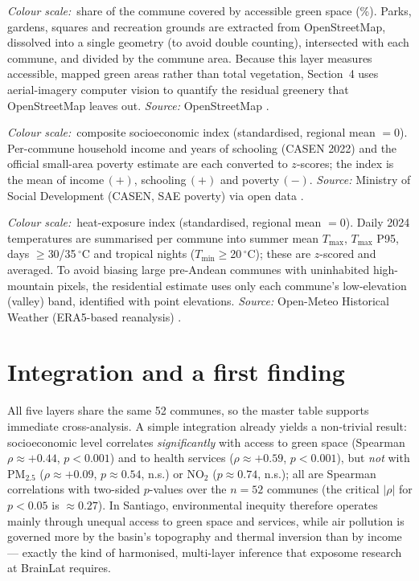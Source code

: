 \documentclass[10pt,a4paper]{article}
\let\citep\parencite
\newcommand{\colorbarval}[1]{\textit{Colour scale:}~#1}
\begin{document}
\begin{description}[leftmargin=0pt,labelsep=0.4em,itemsep=4pt,style=nextline]
\item[\textcolor{softpink}{Green space}]
\colorbarval{share of the commune covered by accessible green space (\%).}
Parks, gardens, squares and recreation grounds are extracted from OpenStreetMap, dissolved into a single geometry (to avoid double counting), intersected with each commune, and divided by the commune area. Because this layer measures accessible, mapped green areas rather than total vegetation, Section~4 uses aerial-imagery computer vision to quantify the residual greenery that OpenStreetMap leaves out. \emph{Source:} OpenStreetMap \citep{OSM2024}.

\item[\textcolor{softpink}{Socioeconomic level}]
\colorbarval{composite socioeconomic index (standardised, regional mean $=0$).}
Per-commune household income and years of schooling (CASEN 2022) and the official small-area poverty estimate are each converted to $z$-scores; the index is the mean of income\,$(+)$, schooling\,$(+)$ and poverty\,$(-)$. \emph{Source:} Ministry of Social Development (CASEN, SAE poverty) via open data \citep{CASEN2022,OleaData2024}.

\item[\textcolor{softpink}{Urban heat}]
\colorbarval{heat-exposure index (standardised, regional mean $=0$).}
Daily 2024 temperatures are summarised per commune into summer mean $T_{\max}$, $T_{\max}$ P95, days $\geq$30/35\,$^\circ$C and tropical nights ($T_{\min}\geq$20\,$^\circ$C); these are $z$-scored and averaged. To avoid biasing large pre-Andean communes with uninhabited high-mountain pixels, the residential estimate uses only each commune's low-elevation (valley) band, identified with point elevations. \emph{Source:} Open-Meteo Historical Weather (ERA5-based reanalysis) \citep{OpenMeteo2024}.

\end{description}

\section{Integration and a first finding}

All five layers share the same 52 communes, so the master table supports immediate cross-analysis. A simple integration already yields a non-trivial result: socioeconomic level correlates \emph{significantly} with access to green space (Spearman $\rho\approx{+}0.44$, $p<0.001$) and to health services ($\rho\approx{+}0.59$, $p<0.001$), but \emph{not} with PM$_{2.5}$ ($\rho\approx{+}0.09$, $p\approx0.54$, n.s.) or NO$_2$ ($p\approx0.74$, n.s.); all are Spearman correlations with two-sided $p$-values over the $n{=}52$ communes (the critical $|\rho|$ for $p<0.05$ is $\approx0.27$). In Santiago, environmental inequity therefore operates mainly through unequal access to green space and services, while air pollution is governed more by the basin's topography and thermal inversion than by income --- exactly the kind of harmonised, multi-layer inference that exposome research at BrainLat requires.
\end{document}
